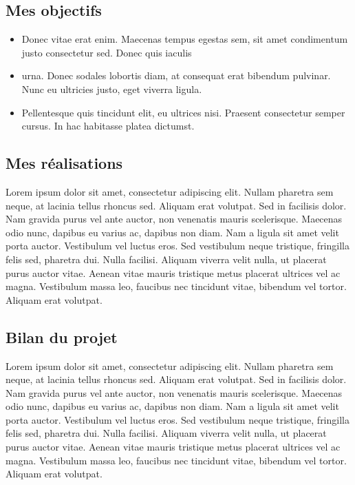 \documentclass[a4paper,11pt,twoside]{report}
\begin{document}
    \subsection*{Mes objectifs}
      \begin{itemize}

	\item Donec vitae erat enim. Maecenas tempus egestas sem, sit amet condimentum justo consectetur sed. Donec quis iaculis 
	\item urna. Donec sodales lobortis diam, at consequat erat bibendum pulvinar. Nunc eu ultricies justo, eget viverra ligula. 
	\item Pellentesque quis tincidunt elit, eu ultrices nisi. Praesent consectetur semper cursus. In hac habitasse platea dictumst. 

      \end{itemize}
    \subsection*{Mes réalisations}
    Lorem ipsum dolor sit amet, consectetur adipiscing elit. Nullam pharetra sem neque, at lacinia tellus rhoncus sed. Aliquam erat volutpat. Sed in facilisis dolor. Nam gravida purus vel ante auctor, non venenatis mauris scelerisque. Maecenas odio nunc, dapibus eu varius ac, dapibus non diam. Nam a ligula sit amet velit porta auctor. Vestibulum vel luctus eros. Sed vestibulum neque tristique, fringilla felis sed, pharetra dui. Nulla facilisi. Aliquam viverra velit nulla, ut placerat purus auctor vitae. Aenean vitae mauris tristique metus placerat ultrices vel ac magna. Vestibulum massa leo, faucibus nec tincidunt vitae, bibendum vel tortor. Aliquam erat volutpat.
    \subsection*{Bilan du projet}
    Lorem ipsum dolor sit amet, consectetur adipiscing elit. Nullam pharetra sem neque, at lacinia tellus rhoncus sed. Aliquam erat volutpat. Sed in facilisis dolor. Nam gravida purus vel ante auctor, non venenatis mauris scelerisque. Maecenas odio nunc, dapibus eu varius ac, dapibus non diam. Nam a ligula sit amet velit porta auctor. Vestibulum vel luctus eros. Sed vestibulum neque tristique, fringilla felis sed, pharetra dui. Nulla facilisi. Aliquam viverra velit nulla, ut placerat purus auctor vitae. Aenean vitae mauris tristique metus placerat ultrices vel ac magna. Vestibulum massa leo, faucibus nec tincidunt vitae, bibendum vel tortor. Aliquam erat volutpat.
\end{document}
